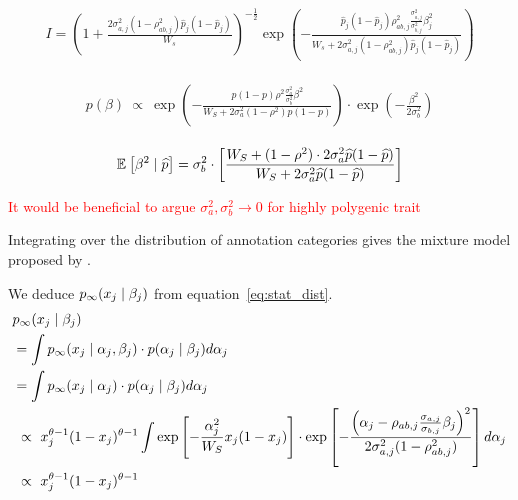 \documentclass[10pt]{article}
\begin{document}
\begin{align}
    I = 
    \left( 1 + \frac{2\sigma_{a,j}^2(1 - \rho_{ab,j}^2)\hat{p}_j(1 - \hat{p}_j)}{W_s} \right)^{-\frac{1}{2}} \exp \left( -\frac{\hat{p}_j(1 - \hat{p}_j) \rho_{ab,j}^2 \frac{\sigma_{a,j}^2}{\sigma_{b,j}^2} \beta_j^2}{W_s + 2\sigma_{a,j}^2(1 - \rho_{ab,j}^2)\hat{p}_j(1 - \hat{p}_j)} \right)
\end{align}

\begin{align}
    \begin{aligned}
    p(\beta) \ \propto \
        \exp
        \left(
        -
    \frac{
        p(1-p)\rho^2 \frac{\sigma_a^2}{\sigma_b^2}\beta^2 
    }{
        W_S + 2\sigma_a^2 (1-\rho^2)p(1-p) 
    }
        \right) \cdot
        \exp 
        \left(
            -\frac{\beta^2}{2\sigma_b^2}
        \right)
    \end{aligned}
\end{align}

\begin{align}
    \E[]{\beta^2 \mid \hp} = 
    \sigma_b^2 \cdot
    \left[
        \frac{
            W_S + (1-\rho^2) \cdot 2\sigma_a^2 \hp(1-\hp)
        }{
            W_S + 2\sigma_a^2 \hp(1-\hp)
        }
    \right]
\end{align}

\textcolor{red}{It would be beneficial to argue $\sigma_a^2, \sigma_b^2 \rightarrow 0 $ for highly polygenic trait}



Integrating over the distribution of annotation categories gives the mixture model proposed by \citet{OConnor2021fourier, OConnor2025polygenicity}.


We deduce $\pinf(x_j \mid \beta_j)$ from equation~\ref{eq:stat_dist}.
\begin{align}
    \begin{aligned}
        &\pinf(x_j \mid \beta_j) \\
        &=
        \int \pinf(x_j \mid \alpha_j, \beta_j) \cdot p(\alpha_j \mid \beta_j) d\alpha_j \\
        &= \int \pinf(x_j \mid \alpha_j) \cdot p(\alpha_j \mid \beta_j) d\alpha_j \\
        &\ \propto \
        x_j^{\theta-1}(1-x_j)^{\theta-1} 
        \int
        \exp\left[
        -\frac{\alpha_j^2}{W_S}x_j(1-x_j) 
        \right] \cdot 
        \exp \left[ -\frac{\left( \alpha_j - \rho_{ab,j} \frac{\sigma_{a,j}}{\sigma_{b,j}} \beta_j \right)^2}{2 \sigma_{a,j}^2 (1 - \rho_{ab,j}^2)} \right] d\alpha_j \\
        & \ \propto \
        x_j^{\theta-1}(1-x_j)^{\theta-1}
    \end{aligned}
\end{align}
\end{document}
